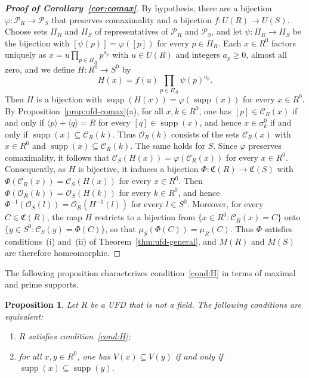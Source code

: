 \documentclass[12pt,reqno,a4paper]{amsart}
\newcommand{\Pe}{\mathcal{P}}
\DeclareMathOperator{\supp}{supp}
\theoremstyle{plain}
\newtheorem{proposition}[theorem]{Proposition}
\theoremstyle{definition}
\begin{document}
\begin{proof}[\normalfont\bfseries Proof of Corollary~\ref{cor:comax}]
By hypothesis, there are a bijection $\varphi\colon\Pe_R\to\Pe_S$ that preserves comaximality and a bijection $f\colon U(R)\to U(S)$. Choose sets $\Pi_R$ and $\Pi_S$ of representatives of $\Pe_R$ and $\Pe_S$, and let $\psi\colon\Pi_R\to\Pi_S$ be the bijection with $[\psi(p)]=\varphi([p])$ for every $p\in\Pi_R$. Each $x\in R^0$ factors uniquely as $x=u\prod\limits_{p\in\Pi_R}p^{a_p}$ with $u\in U(R)$ and integers $a_p\geq0$, almost all zero, and we define $H\colon R^0\to S^0$ by
\[
H(x)=f(u)\prod_{p\in\Pi_R}\psi(p)^{a_p}.
\]
Then $H$ is a bijection with $\supp(H(x))=\varphi(\supp(x))$ for every $x\in R^0$. By Proposition~\ref{prop:ufd-comax}(a), for all $x,k\in R^0$, one has $[p]\in\mathcal{C}_R(x)$ if and only if $\langle p\rangle+\langle q\rangle=R$ for every $[q]\in\supp(x)$, and hence $x\in\sigma_k^0$ if and only if $\supp(x)\subseteq\mathcal{C}_R(k)$. Thus $\mathcal{O}_R(k)$ consists of the sets $\mathcal{C}_R(x)$ with $x\in R^0$ and $\supp(x)\subseteq\mathcal{C}_R(k)$. The same holds for $S$. Since $\varphi$ preserves comaximality, it follows that $\mathcal{C}_S(H(x))=\varphi(\mathcal{C}_R(x))$ for every $x\in R^0$. Consequently, as $H$ is bijective, it induces a bijection $\Phi\colon\mathfrak{C}(R)\to\mathfrak{C}(S)$ with $\Phi(\mathcal{C}_R(x))=\mathcal{C}_S(H(x))$ for every $x\in R^0$. Then $\Phi(\mathcal{O}_R(k))=\mathcal{O}_S(H(k))$ for every $k\in R^0$, and hence $\Phi^{-1}(\mathcal{O}_S(l))=\mathcal{O}_R(H^{-1}(l))$ for every $l\in S^0$. Moreover, for every $C\in\mathfrak{C}(R)$, the map $H$ restricts to a bijection from $\{x\in R^0:\mathcal{C}_R(x)=C\}$ onto $\{y\in S^0:\mathcal{C}_S(y)=\Phi(C)\}$, so that $\mu_S(\Phi(C))=\mu_R(C)$. Thus $\Phi$ satisfies conditions~(i) and~(ii) of Theorem~\ref{thm:ufd-general}, and $M(R)$ and $M(S)$ are therefore homeomorphic.
\end{proof}

The following proposition characterizes condition~\ref{cond:H} in terms of maximal and prime supports.
\begin{proposition}\label{prop:J-ufd}
Let $R$ be a UFD that is not a field. The following conditions are equivalent:
\begin{enumerate}[label=\textup{(\roman*)}]
\item $R$ satisfies condition~\ref{cond:H};
\item for all $x,y\in R^0$, one has $V(x)\subseteq V(y)$ if and only if $\supp(x)\subseteq\supp(y)$.
\end{enumerate}
\end{proposition}
\end{document}
